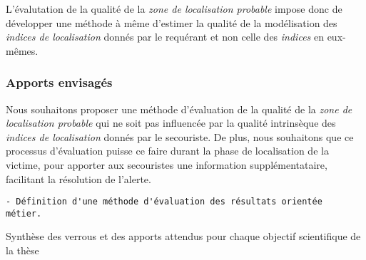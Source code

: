 L'évalutation de la qualité de la \emph{zone de localisation probable}
impose donc de développer une méthode à même d'estimer la qualité de
la modélisation des \emph{indices de localisation} donnés par le
requérant et non celle des \emph{indices} en eux-mêmes.

\subsubsection{Apports envisagés}

Nous souhaitons proposer une méthode d'évaluation de la qualité de la
\emph{zone de localisation probable} qui ne soit pas influencée par la
qualité intrinsèque des \emph{indices de localisation} donnés par le
secouriste. De plus, nous souhaitons que ce processus d'évaluation
puisse ce faire durant la phase de localisation de la victime, pour
apporter aux secouristes une information supplémentataire, facilitant
la résolution de l'alerte.

\begin{verbatim}
- Définition d'une méthode d'évaluation des résultats orientée
métier. 
\end{verbatim}

\begin{table}[h]
  \centering
  
  \caption{Synthèse des verrous et des apports attendus pour chaque
    objectif scientifique de la thèse}
  \label{tab:synthese_objectifs}
\end{table}

